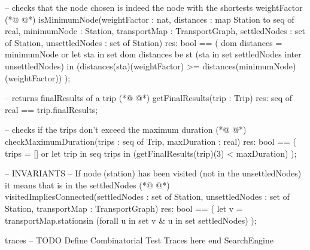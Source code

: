 \begin{vdmpp}[breaklines=true]
 -- checks that the node chosen is indeed the node with the shortests weightFactor
(*@
\label{isMinimumNode:559}
@*)
 isMinimumNode(weightFactor : nat, distances : map Station to seq of real, minimumNode : Station, transportMap : TransportGraph, settledNodes : set of Station, unsettledNodes : set of Station) res: bool ==
 (
  dom distances = {minimumNode} 
  or
  let sta in set dom distances
  be st (sta in set settledNodes inter unsettledNodes)
  in (distances(sta)(weightFactor) >= distances(minimumNode)(weightFactor))
 );
 
 -- returns finalResults of a trip
(*@
\label{getFinalResults:569}
@*)
 getFinalResults(trip : Trip) res: seq of real == trip.finalResults;
 
 -- checks if the trips don't exceed the maximum duration
(*@
\label{checkMaximumDuration:572}
@*)
 checkMaximumDuration(trips : seq of Trip, maxDuration : real) res: bool ==
 (
  trips  = [] or
  let trip in seq trips 
  in (getFinalResults(trip)(3) < maxDuration)
 );
 
 -- INVARIANTS
 -- If node (station) has been visited (not in the unsettledNodes) it means that is in the settledNodes
(*@
\label{visitedImpliesConnected:581}
@*)
 visitedImpliesConnected(settledNodes : set of Station, unsettledNodes : set of Station, transportMap : TransportGraph) res: bool ==
 (
  let v = transportMap.stations\unsettledNodes in (forall u in set v & u in set settledNodes) 
 );

traces
-- TODO Define Combinatorial Test Traces here
end SearchEngine
\end{vdmpp}
\bigskip
